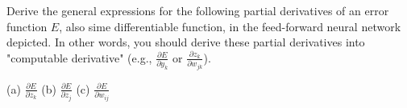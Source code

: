 \documentclass{article}
\begin{document}
Derive the general expressions for the following partial derivatives of an error function $E$, also sime differentiable function, in the feed-forward neural network depicted. In other words, you should derive these partial derivatives into "computable derivative" (e.g., $\frac{\partial E}{\partial y_k}$ or $\frac{\partial z_k}{\partial w_{jk}}$).
\begin{center}
(a) $\frac{\partial E}{\partial z_k}$
(b) $\frac{\partial E}{\partial z_j}$
(c) $\frac{\partial E}{\partial w_{ij}}$
\end{center}
\end{document}
